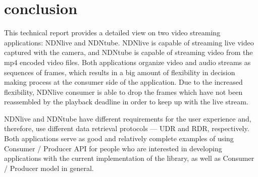 \section{conclusion} %
\label{sec:conclusion}
This technical report provides a detailed view on two video streaming applications: NDNlive and NDNtube.
NDNlive is capable of streaming live video captured with the camera, and NDNtube is capable of streaming video from the mp4 encoded video files. Both applications organize video and audio streams as sequences of frames, which results in a big amount of flexibility in decision making process at the consumer side of the application. Due to the increased flexibility, NDNlive consumer is able to drop the frames which have not been reassembled by the playback deadline in order to keep up with the live stream. 

NDNlive and NDNtube have different requirements for the user experience and, therefore, use different data retrieval protocols --- UDR and RDR, respectively. Both applications serve as good and relatively complete examples of using Consumer / Producer API for people who are interested in developing applications with the current implementation of the library, as well as Consumer / Producer model in general.